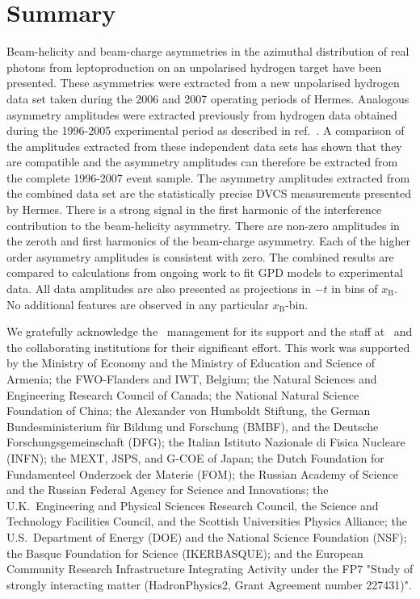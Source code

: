 \section{Summary}


Beam-helicity and beam-charge asymmetries in the azimuthal distribution of real photons from leptoproduction on an unpolarised hydrogen target have been presented. These asymmetries were extracted from a new unpolarised hydrogen data set taken during the 2006 and 2007 operating periods of H{\sc ermes}. Analogous asymmetry amplitudes were extracted previously from hydrogen data obtained during the 1996-2005 experimental period as described in ref.~\cite{Air09}. A comparison of the amplitudes extracted from these independent data sets has shown that they are compatible and the asymmetry amplitudes can therefore be extracted from the complete 1996-2007 event sample. The asymmetry amplitudes extracted from the combined data set are the  statistically precise DVCS measurements presented by H{\sc ermes}. There is a strong signal in the first harmonic of the interference contribution to the beam-helicity asymmetry. There are non-zero amplitudes in the zeroth and first harmonics of the beam-charge asymmetry. Each of the higher order asymmetry amplitudes is consistent with zero. The combined results are compared to calculations from ongoing work to fit GPD models to experimental data. All data amplitudes are also presented as projections in $-t$ in bins of $x_{\textrm{B}}$. No additional features are observed in any particular $x_{\textrm{B}}$-bin.

\acknowledgments

We gratefully acknowledge the \desy\ management for its support and the staff
at \desy\ and the collaborating institutions for their significant effort.
This work was supported by 
the Ministry of Economy and the Ministry of Education and Science of Armenia;
the FWO-Flanders and IWT, Belgium;
the Natural Sciences and Engineering Research Council of Canada;
the National Natural Science Foundation of China;
the Alexander von Humboldt Stiftung,
the German Bundesministerium f\"ur Bildung und Forschung (BMBF), and
the Deutsche Forschungsgemeinschaft (DFG);
the Italian Istituto Nazionale di Fisica Nucleare (INFN);
the MEXT, JSPS, and G-COE of Japan;
the Dutch Foundation for Fundamenteel Onderzoek der Materie (FOM);
the Russian Academy of Science and the Russian Federal Agency for 
Science and Innovations;
the U.K.~Engineering and Physical Sciences Research Council, 
the Science and Technology Facilities Council,
and the Scottish Universities Physics Alliance;
the U.S.~Department of Energy (DOE) and the National Science Foundation (NSF);
the Basque Foundation for Science (IKERBASQUE);
and the European Community Research Infrastructure Integrating Activity
under the FP7 "Study of strongly interacting matter (HadronPhysics2, Grant
Agreement number 227431)".


